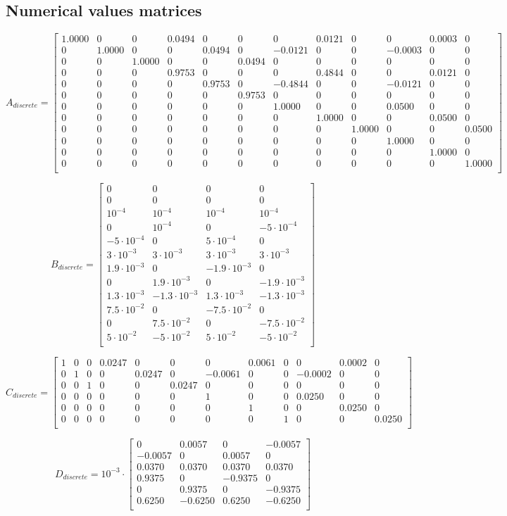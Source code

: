 \subsection{Numerical values matrices}
$$
A_{discrete}=
\begin{bmatrix}
1.0000&0&0&0.0494&0&0&0&0.0121&0&0&0.0003&0 \\
0&1.0000&0&0&0.0494&0&-0.0121&0&0&-0.0003&0&0 \\
0&0&1.0000&0&0&0.0494&0&0&0&0&0&0 \\
0&0&0&0.9753&0&0&0&0.4844&0&0&0.0121&0 \\
0&0&0&0&0.9753&0&-0.4844&0&0&-0.0121&0&0 \\
0&0&0&0&0&0.9753&0&0&0&0&0&0 \\
0&0&0&0&0&0&1.0000&0&0&0.0500&0&0 \\
0&0&0&0&0&0&0&1.0000&0&0&0.0500&0 \\
0&0&0&0&0&0&0&0&1.0000&0&0&0.0500 \\
0&0&0&0&0&0&0&0&0&1.0000&0&0 \\
0&0&0&0&0&0&0&0&0&0&1.0000&0 \\
0&0&0&0&0&0&0&0&0&0&0&1.0000 \\
\end{bmatrix}
$$

$$
B_{discrete}=
\begin{bmatrix}
0&0&0&0 \\
0&0&0&0 \\
10^{-4}&10^{-4}&10^{-4}&10^{-4} \\
0&10^{-4}&0&-5\cdot 10^{-4} \\
-5 \cdot 10^{-4}&0&5 \cdot 10^{-4}&0 \\
3\cdot 10^{-3}&3\cdot 10^{-3}&3\cdot 10^{-3}&3\cdot 10^{-3} \\
1.9\cdot 10^{-3}&0&-1.9\cdot 10^{-3}&0 \\
0&1.9\cdot 10^{-3}&0&-1.9\cdot 10^{-3} \\
1.3 \cdot 10^{-3}&-1.3 \cdot 10^{-3} &1.3 \cdot 10^{-3}&-1.3 \cdot 10^{-3} \\
7.5\cdot 10^{-2}&0&-7.5\cdot 10^{-2}&0 \\
0&7.5\cdot 10^{-2}&0&-7.5\cdot 10^{-2} \\
5\cdot 10^{-2}&-5\cdot 10^{-2}&5\cdot 10^{-2}&-5\cdot 10^{-2} \\
\end{bmatrix}
$$

$$
C_{discrete}=
\begin{bmatrix}
1&0&0&0.0247&0&0&0&0.0061&0&0&0.0002&0 \\
0&1&0&0&0.0247&0&-0.0061&0&0&-0.0002&0&0 \\
0&0&1&0&0&0.0247&0&0&0&0&0&0 \\
0&0&0&0&0&0&1&0&0&0.0250&0&0 \\
0&0&0&0&0&0&0&1&0&0&0.0250&0 \\
0&0&0&0&0&0&0&0&1&0&0&0.0250 \\
\end{bmatrix}
$$

$$
D_{discrete}=
10^{-3} \cdot
\begin{bmatrix}
0&0.0057&0&-0.0057 \\
-0.0057&0&0.0057&0 \\
0.0370&0.0370&0.0370&0.0370 \\
0.9375&0&-0.9375&0 \\
0&0.9375&0&-0.9375 \\
0.6250&-0.6250&0.6250&-0.6250 \\
\end{bmatrix}
$$